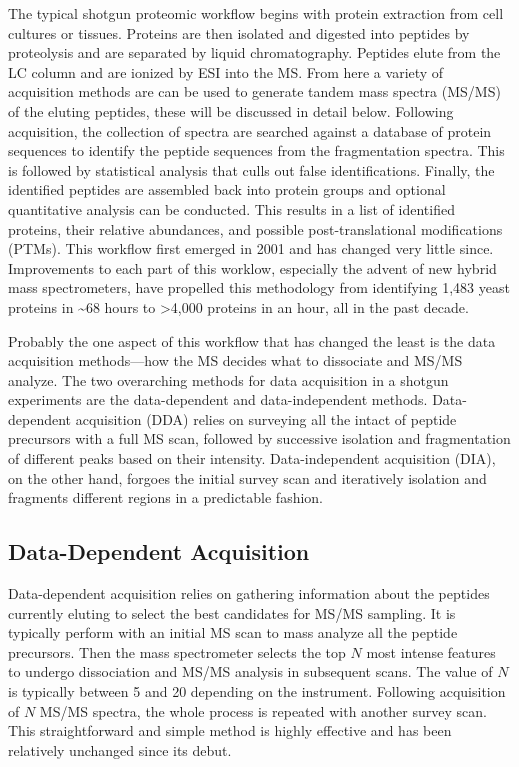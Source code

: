 The typical shotgun proteomic workflow begins with protein extraction from cell cultures or tissues. Proteins are then isolated and digested into peptides by proteolysis and are separated by liquid chromatography. Peptides elute from the LC column and are ionized by ESI into the MS. From here a variety of acquisition methods are can be used to generate tandem mass spectra (MS/MS) of the eluting peptides, these will be discussed in detail below. Following acquisition, the collection of spectra are searched against a database of protein sequences to identify the peptide sequences from the fragmentation spectra. This is followed by statistical analysis that culls out false identifications.\cite{targetdecoy} Finally, the identified peptides are assembled back into protein groups and optional quantitative analysis can be conducted. This results in a list of identified proteins, their relative abundances, and possible post-translational modifications (PTMs). This workflow first emerged in 2001 and has changed very little since.\cite{mudpit} Improvements to each part of this worklow, especially the advent of new hybrid mass spectrometers, have propelled this methodology from identifying 1,483 yeast proteins in \textasciitilde68 hours to >4,000 proteins in an hour, all in the past decade.\cite{onehour}

Probably the one aspect of this workflow that has changed the least is the data acquisition methods---how the MS decides what \mz{} to dissociate and MS/MS analyze. The two overarching methods for data acquisition in a shotgun experiments are the data-dependent and data-independent methods. Data-dependent acquisition (DDA) relies on surveying all the intact \mz{} of peptide precursors with a full MS scan, followed by successive isolation and fragmentation of different \mz{} peaks based on their intensity.\cite{dda1,dda2} Data-independent acquisition (DIA), on the other hand, forgoes the initial survey scan and iteratively isolation and fragments different \mz{} regions in a predictable fashion.\cite{dia1,dia2}

\subsection*{Data-Dependent Acquisition}
Data-dependent acquisition relies on gathering information about the peptides currently eluting to select the best candidates for MS/MS sampling. It is typically perform with an initial MS scan to mass analyze all the peptide precursors. Then the mass spectrometer selects the top $N$ most intense \mz{} features to undergo dissociation and MS/MS analysis in subsequent scans. The value of $N$ is typically between 5 and 20 depending on the instrument. Following acquisition of $N$ MS/MS spectra, the whole process is repeated with another survey scan. This straightforward and simple method is highly effective and has been relatively unchanged since its debut.

